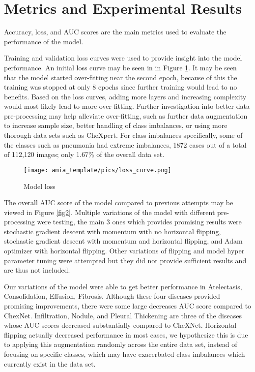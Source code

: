 \documentclass{amia}
\begin{document}
\section*{Metrics and Experimental Results}
Accuracy, loss, and AUC scores are the main metrics used to evaluate the performance of the model.


Training and validation loss curves were used to provide insight into the model performance. An initial loss curve may be seen in in Figure \ref{fig1}. It may be seen that the model started over-fitting near the second epoch, because of this the training was stopped at only 8 epochs since further training would lead to no benefits. Based on the loss curves, adding more layers and increasing complexity would most likely lead to more over-fitting. Further investigation into better data pre-processing may help alleviate over-fitting, such as further data augmentation to increase sample size, better handling of class imbalances, or using more thorough data sets such as CheXpert. For class imbalances specifically, some of the classes such as pneumonia had extreme imbalances, 1872  cases  out  of  a total of 112,120 images;  only 1.67\% of the overall data set.

\begin{figure}[h!]
\centering
\texttt{[image: amia\_template/pics/loss\_curve.png]}
\caption{Model loss}
\label{fig1}
\end{figure}

The overall AUC score of the model compared to previous attempts may be viewed in Figure \ref{fig2}. Multiple variations of the model with different pre-processing were testing, the main 3 ones which provides promising results were stochastic gradient descent with momentum with no horizontal flipping, stochastic gradient descent with momentum and horizontal flipping, and Adam optimizer with horizontal flipping. Other variations of flipping and model hyper parameter tuning were attempted but they did not provide sufficient results and are thus not included.

Our variations of the model were able to get better performance in Atelectasis, Consolidation, Effusion, Fibrosis. Although these four diseases provided promising improvements, there were some large decreases AUC score compared to ChexNet. Infiltration, Nodule, and Pleural Thickening are three of the diseases whose AUC scores decreased substantially compared to CheXNet. Horizontal flipping actually decreased performance in most cases, we hypothesize this is due to applying this augmentation randomly across the entire data set, instead of focusing on specific classes, which may have exacerbated class imbalances which currently exist in the data set.
\end{document}
